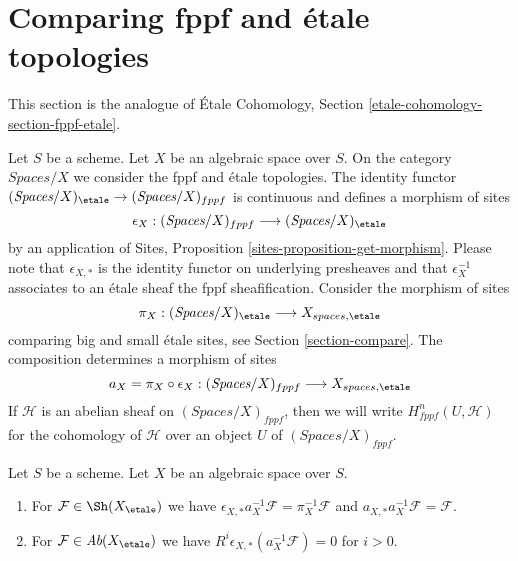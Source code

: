 \section{Comparing fppf and \'etale topologies}
\label{section-fppf-etale}

\noindent
This section is the analogue of
\'Etale Cohomology, Section \ref{etale-cohomology-section-fppf-etale}.

\medskip\noindent
Let $S$ be a scheme. Let $X$ be an algebraic space over $S$.
On the category $\textit{Spaces}/X$ we consider the fppf
and \'etale topologies. The identity functor
$(\textit{Spaces}/X)_\etale \to (\textit{Spaces}/X)_{fppf}$
is continuous and defines a morphism of sites
$$
\epsilon_X :
(\textit{Spaces}/X)_{fppf} \longrightarrow (\textit{Spaces}/X)_\etale
$$
by an application of Sites, Proposition \ref{sites-proposition-get-morphism}.
Please note that $\epsilon_{X, *}$ is the identity functor on underlying
presheaves and that $\epsilon_X^{-1}$ associates to an \'etale sheaf the
fppf sheafification.
Consider the morphism of sites
$$
\pi_X : (\textit{Spaces}/X)_\etale \longrightarrow X_{spaces, \etale}
$$
comparing big and small \'etale sites, see Section \ref{section-compare}.
The composition determines a morphism of sites
$$
a_X = \pi_X \circ \epsilon_X :
(\textit{Spaces}/X)_{fppf}
\longrightarrow
X_{spaces, \etale}
$$
If $\mathcal{H}$ is an abelian sheaf on $(\textit{Spaces}/X)_{fppf}$,
then we will write $H^n_{fppf}(U, \mathcal{H})$ for the cohomology
of $\mathcal{H}$ over an object $U$ of $(\textit{Spaces}/X)_{fppf}$.

\begin{lemma}
\label{lemma-comparison-fppf-etale}
Let $S$ be a scheme. Let $X$ be an algebraic space over $S$.
\begin{enumerate}
\item For $\mathcal{F} \in \Sh(X_\etale)$ we have
$\epsilon_{X, *}a_X^{-1}\mathcal{F} = \pi_X^{-1}\mathcal{F}$
and $a_{X, *}a_X^{-1}\mathcal{F} = \mathcal{F}$.
\item For $\mathcal{F} \in \textit{Ab}(X_\etale)$ we have
$R^i\epsilon_{X, *}(a_X^{-1}\mathcal{F}) = 0$ for $i > 0$.
\end{enumerate}
\end{lemma}


